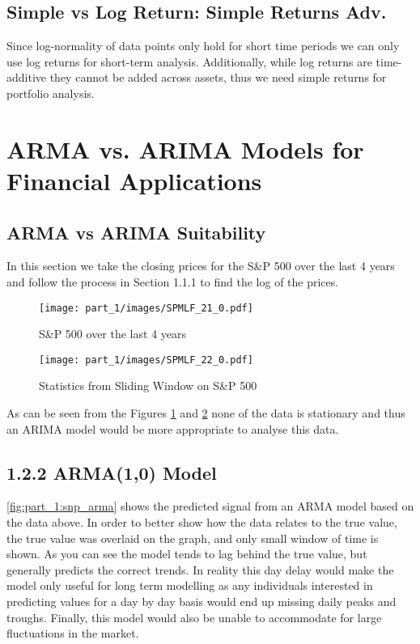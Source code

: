 \subsection{Simple vs Log Return: Simple Returns Adv.}
Since log-normality of data points only hold for short time periods we can only use log returns for short-term analysis. Additionally, while log returns are time-additive they cannot be added across assets, thus we need simple returns for portfolio analysis.

\section{ARMA vs. ARIMA Models for Financial Applications}

\subsection{ARMA vs ARIMA Suitability}

In this section we take the closing prices for the S\&P 500 over the last 4 years and follow the process in Section 1.1.1 to find the log of the prices.

\begin{figure}[!htb]
    \centering
    \texttt{[image: part\_1/images/SPMLF\_21\_0.pdf]}
    \caption{S\&P 500 over the last 4 years}
    \label{fig:part_1:snp_log_closing}
\end{figure}


\begin{figure}[!htb]
    \centering
    \texttt{[image: part\_1/images/SPMLF\_22\_0.pdf]}
    \caption{Statistics from Sliding Window on S\&P 500}
    \label{fig:part_1:snp_sw}
\end{figure}

As can be seen from the Figures \ref{fig:part_1:snp_log_closing} and \ref{fig:part_1:snp_sw} none of the data is stationary and thus an ARIMA model would be more appropriate to analyse this data.

\subsection{1.2.2 ARMA(1,0) Model}
\autoref{fig:part_1:snp_arma} shows the predicted signal from an ARMA model based on the data above. In order to better show how the data relates to the true value, the true value was overlaid on the graph, and only small window of time is shown. As you can see the model tends to lag behind the true value, but generally predicts the correct trends. In reality this  day delay would make the model only useful for long term modelling as any individuals interested in predicting values for a day by day basis would end up missing daily peaks and troughs. Finally, this model would also be unable to accommodate for large fluctuations in the market.

